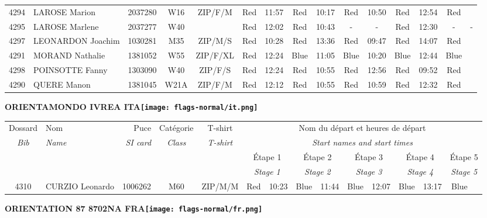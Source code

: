 \documentclass{report}
\begin{document}
\begin{longtable}{|c|l|r|c|c|*{5}{cc|}}
    4294 & LAROSE Marion & 2037280 & W16 & ZIP/F/M & Red & 11:57 & Red & 10:17 & Red & 10:50 & Red & 12:54 & Red &  \\
    4295 & LAROSE Marlene & 2037277 & W40 &   & Red & 12:02 & Red & 10:43 & - &  - & Red & 12:30 & - &  -\\
    4297 & LEONARDON Joachim & 1030281 & M35 & ZIP/M/S & Red & 10:28 & Red & 13:36 & Red & 09:47 & Red & 14:07 & Red &  \\
    4291 & MORAND Nathalie & 1381052 & W55 & ZIP/F/XL & Red & 12:24 & Blue & 11:05 & Blue & 10:20 & Blue & 12:44 & Blue &  \\
    4298 & POINSOTTE Fanny & 1303090 & W40 & ZIP/F/S & Red & 12:24 & Red & 10:55 & Red & 12:56 & Red & 09:52 & Red &  \\
    4290 & QUERE Manon & 1381045 & W21A & ZIP/F/M & Red & 12:12 & Red & 10:55 & Red & 10:59 & Red & 12:32 & Red &  \\
  \end{longtable}
\newpage
  \Huge \centering \bfseries ORIENTAMONDO IVREA  ITA\normalfont \footnotesize \sffamily \hfill \texttt{[image: flags-normal/it.png]} \newline 
  \begin{longtable}{|c|l|r|c|c|*{5}{cc|}}
    Dossard & Nom  & Puce    & Catégorie & T-shirt & \multicolumn{10}{c|}{Nom du départ et heures de départ} \\
    \itshape Bib     & \itshape Name & \itshape SI card & \itshape Class  & \itshape  T-shirt  & \multicolumn{10}{c|}{\itshape Start names and start times} \\
    \hline
    & & & & & \multicolumn{2}{c|}{Étape 1} & \multicolumn{2}{c|}{Étape 2} & \multicolumn{2}{c|}{Étape 3} & \multicolumn{2}{c|}{Étape 4} & \multicolumn{2}{c|}{Étape 5} \\
    & & & & & \multicolumn{2}{c|}{\itshape Stage 1} & \multicolumn{2}{c|}{\itshape Stage 2} & \multicolumn{2}{c|}{\itshape Stage 3} & \multicolumn{2}{c|}{\itshape Stage 4} & \multicolumn{2}{c|}{\itshape Stage 5} \\
    \hline
    4310 & CURZIO Leonardo & 1006262 & M60 & ZIP/M/M & Red & 10:23 & Blue & 11:44 & Blue & 12:07 & Blue & 13:17 & Blue &  \\
  \end{longtable}
\newpage
  \Huge \centering \bfseries ORIENTATION 87 8702NA FRA\normalfont \footnotesize \sffamily \hfill \texttt{[image: flags-normal/fr.png]} \newline 
\end{document}
